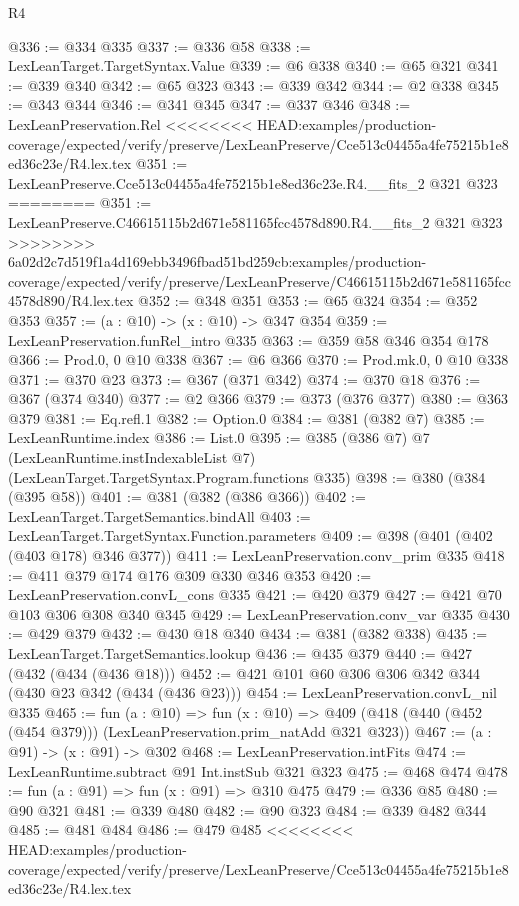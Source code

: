 \begin{lexlean}{R4}
\begin{coremodule}
{{{{{{{{{{{{{{{{{{{{@336 := @334 @335
@337 := @336 @58
@338 := LexLeanTarget.TargetSyntax.Value
@339 := @6 @338
@340 := @65 @321
@341 := @339 @340
@342 := @65 @323
@343 := @339 @342
@344 := @2 @338
@345 := @343 @344
@346 := @341 @345
@347 := @337 @346
@348 := LexLeanPreservation.Rel
<<<<<<<< HEAD:examples/production-coverage/expected/verify/preserve/LexLeanPreserve/Cce513c04455a4fe75215b1e8ed36c23e/R4.lex.tex
@351 := LexLeanPreserve.Cce513c04455a4fe75215b1e8ed36c23e.R4.__fits_2 @321 @323
========
@351 := LexLeanPreserve.C46615115b2d671e581165fcc4578d890.R4.__fits_2 @321 @323
>>>>>>>> 6a02d2c7d519f1a4d169ebb3496fbad51bd259cb:examples/production-coverage/expected/verify/preserve/LexLeanPreserve/C46615115b2d671e581165fcc4578d890/R4.lex.tex
@352 := @348 @351
@353 := @65 @324
@354 := @352 @353
@357 := (a : @10) -> (x : @10) -> @347 @354
@359 := LexLeanPreservation.funRel_intro @335
@363 := @359 @58 @346 @354 @178
@366 := Prod.{0, 0} @10 @338
@367 := @6 @366
@370 := Prod.mk.{0, 0} @10 @338
@371 := @370 @23
@373 := @367 (@371 @342)
@374 := @370 @18
@376 := @367 (@374 @340)
@377 := @2 @366
@379 := @373 (@376 @377)
@380 := @363 @379
@381 := Eq.refl.{1}
@382 := Option.{0}
@384 := @381 (@382 @7)
@385 := LexLeanRuntime.index
@386 := List.{0}
@395 := @385
    (@386 @7)
    @7
    (LexLeanRuntime.instIndexableList @7)
    (LexLeanTarget.TargetSyntax.Program.functions @335)
@398 := @380 (@384 (@395 @58))
@401 := @381 (@382 (@386 @366))
@402 := LexLeanTarget.TargetSemantics.bindAll
@403 := LexLeanTarget.TargetSyntax.Function.parameters
@409 := @398 (@401 (@402 (@403 @178) @346 @377))
@411 := LexLeanPreservation.conv_prim @335
@418 := @411 @379 @174 @176 @309 @330 @346 @353
@420 := LexLeanPreservation.convL_cons @335
@421 := @420 @379
@427 := @421 @70 @103 @306 @308 @340 @345
@429 := LexLeanPreservation.conv_var @335
@430 := @429 @379
@432 := @430 @18 @340
@434 := @381 (@382 @338)
@435 := LexLeanTarget.TargetSemantics.lookup
@436 := @435 @379
@440 := @427 (@432 (@434 (@436 @18)))
@452 := @421 @101 @60 @306 @306 @342 @344 (@430 @23 @342 (@434 (@436 @23)))
@454 := LexLeanPreservation.convL_nil @335
@465 := fun (a : @10) =>
  fun (x : @10) => @409 (@418 (@440 (@452 (@454 @379))) (LexLeanPreservation.prim_natAdd @321 @323))
@467 := (a : @91) -> (x : @91) -> @302
@468 := LexLeanPreservation.intFits
@474 := LexLeanRuntime.subtract @91 Int.instSub @321 @323
@475 := @468 @474
@478 := fun (a : @91) => fun (x : @91) => @310 @475
@479 := @336 @85
@480 := @90 @321
@481 := @339 @480
@482 := @90 @323
@484 := @339 @482 @344
@485 := @481 @484
@486 := @479 @485
<<<<<<<< HEAD:examples/production-coverage/expected/verify/preserve/LexLeanPreserve/Cce513c04455a4fe75215b1e8ed36c23e/R4.lex.tex
}}}}}}}}}}}}}}}}}}}}
\end{coremodule}
\end{lexlean}
